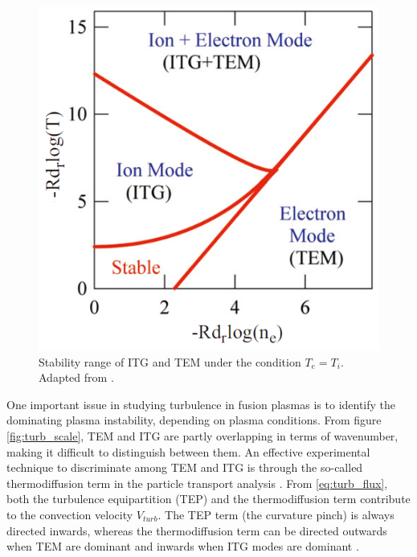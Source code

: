 \begin{figure}[h]
\begin{centering}
\includegraphics[scale=0.45]{stability_range.png}
\par\end{centering}
\caption[Stability range of ITG and TEM]{Stability range of ITG and TEM under the condition $T_e=T_i$. Adapted from \cite{Garbet_ITGTEM_2004_PPCF_EPS}.}
\label{fig:stability_range}
\end{figure}

One important issue in studying turbulence in fusion plasmas is to identify the dominating plasma instability, depending on plasma conditions. From figure \ref{fig:turb_scale}, TEM and ITG are partly overlapping in terms of wavenumber, making it difficult to distinguish between them. An effective experimental technique to discriminate among TEM and ITG is through the so-called thermodiffusion term in the particle transport analysis \cite{Bourdelle_2007_PoP_Qualikiz}. From \eqref{eq:turb_flux}, both the turbulence equipartition (TEP) and the thermodiffusion term contribute to the convection velocity $V_{turb}$. The TEP term (the curvature pinch) is always directed inwards, whereas the thermodiffusion term can be directed outwards when TEM are dominant and inwards when ITG modes are dominant \cite{Bourdelle_PPCF_05_review_turbulent_particle_transport}.


